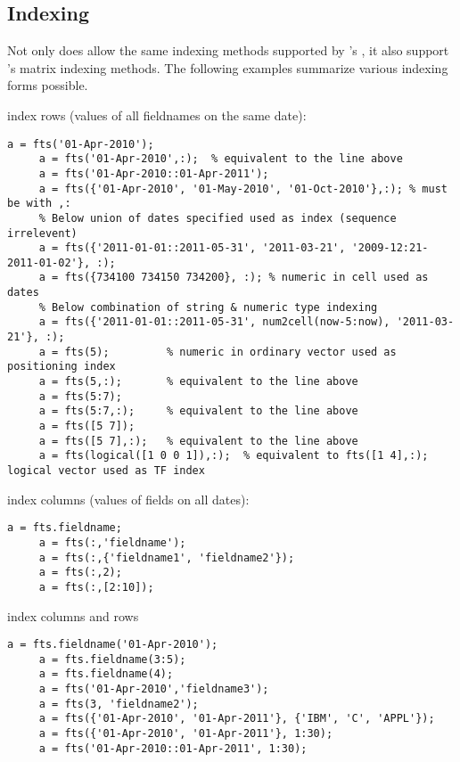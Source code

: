 \subsection{Indexing}

Not only does  allow the same indexing methods supported by \matlab's ,
it also support \matlab's matrix indexing methods.
The following examples summarize various indexing forms possible.

\begin{itemize*}
\item index rows (values of all fieldnames on the same date):
  \begin{lstlisting}[numbers=none]
     a = fts('01-Apr-2010'); 							
     a = fts('01-Apr-2010',:);  % equivalent to the line above  
     a = fts('01-Apr-2010::01-Apr-2011'); 		
     a = fts({'01-Apr-2010', '01-May-2010', '01-Oct-2010'},:); % must be with ,:
	 % Below union of dates specified used as index (sequence irrelevent)
	 a = fts({'2011-01-01::2011-05-31', '2011-03-21', '2009-12:21-2011-01-02'}, :); 
     a = fts({734100 734150 734200}, :); % numeric in cell used as dates
	 % Below combination of string & numeric type indexing
     a = fts({'2011-01-01::2011-05-31', num2cell(now-5:now), '2011-03-21'}, :); 
     a = fts(5); 		 % numeric in ordinary vector used as positioning index										
     a = fts(5,:);       % equivalent to the line above
     a = fts(5:7);         							
     a = fts(5:7,:);     % equivalent to the line above
     a = fts([5 7]);                      		
     a = fts([5 7],:);   % equivalent to the line above
	 a = fts(logical([1 0 0 1]),:);  % equivalent to fts([1 4],:); logical vector used as TF index
 \end{lstlisting}
\item index columns (values of fields on all dates):
  \begin{lstlisting}[numbers=none]
     a = fts.fieldname;
     a = fts(:,'fieldname');
     a = fts(:,{'fieldname1', 'fieldname2'});
     a = fts(:,2);
     a = fts(:,[2:10]);
  \end{lstlisting}
\item index columns and rows
  \begin{lstlisting}[numbers=none]
     a = fts.fieldname('01-Apr-2010'); 
     a = fts.fieldname(3:5);
     a = fts.fieldname(4);
     a = fts('01-Apr-2010','fieldname3');
     a = fts(3, 'fieldname2');
     a = fts({'01-Apr-2010', '01-Apr-2011'}, {'IBM', 'C', 'APPL'});
     a = fts({'01-Apr-2010', '01-Apr-2011'}, 1:30);
     a = fts('01-Apr-2010::01-Apr-2011', 1:30);

\end{lstlisting}
\end{itemize*}
